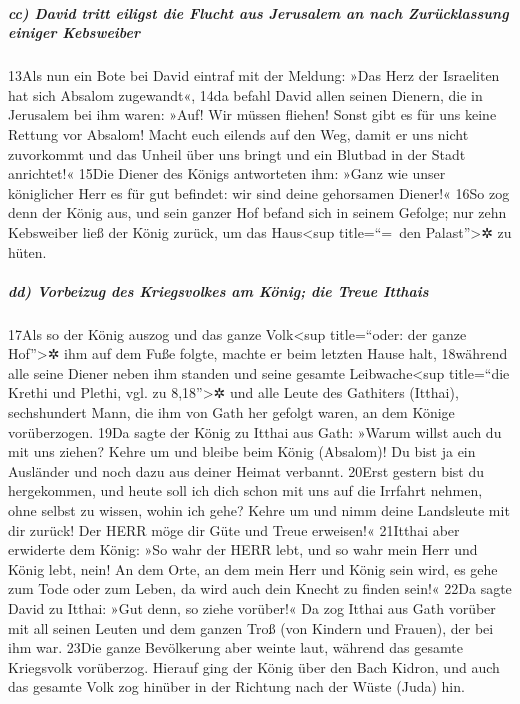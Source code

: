 \hypertarget{cc-david-tritt-eiligst-die-flucht-aus-jerusalem-an-nach-zuruxfccklassung-einiger-kebsweiber}{%
\subparagraph{cc) David tritt eiligst die Flucht aus Jerusalem an nach
Zurücklassung einiger
Kebsweiber}\label{cc-david-tritt-eiligst-die-flucht-aus-jerusalem-an-nach-zuruxfccklassung-einiger-kebsweiber}}

13Als nun ein Bote bei David eintraf mit der Meldung: »Das Herz der
Israeliten hat sich Absalom zugewandt«, 14da befahl David allen seinen
Dienern, die in Jerusalem bei ihm waren: »Auf! Wir müssen fliehen! Sonst
gibt es für uns keine Rettung vor Absalom! Macht euch eilends auf den
Weg, damit er uns nicht zuvorkommt und das Unheil über uns bringt und
ein Blutbad in der Stadt anrichtet!« 15Die Diener des Königs antworteten
ihm: »Ganz wie unser königlicher Herr es für gut befindet: wir sind
deine gehorsamen Diener!« 16So zog denn der König aus, und sein ganzer
Hof befand sich in seinem Gefolge; nur zehn Kebsweiber ließ der König
zurück, um das Haus\textless sup title=``=~den Palast''\textgreater✲ zu
hüten.

\hypertarget{dd-vorbeizug-des-kriegsvolkes-am-kuxf6nig-die-treue-itthais}{%
\subparagraph{dd) Vorbeizug des Kriegsvolkes am König; die Treue
Itthais}\label{dd-vorbeizug-des-kriegsvolkes-am-kuxf6nig-die-treue-itthais}}

17Als so der König auszog und das ganze Volk\textless sup title=``oder:
der ganze Hof''\textgreater✲ ihm auf dem Fuße folgte, machte er beim
letzten Hause halt, 18während alle seine Diener neben ihm standen und
seine gesamte Leibwache\textless sup title=``die Krethi und Plethi, vgl.
zu 8,18''\textgreater✲ und alle Leute des Gathiters (Itthai),
sechshundert Mann, die ihm von Gath her gefolgt waren, an dem Könige
vorüberzogen. 19Da sagte der König zu Itthai aus Gath: »Warum willst
auch du mit uns ziehen? Kehre um und bleibe beim König (Absalom)! Du
bist ja ein Ausländer und noch dazu aus deiner Heimat verbannt. 20Erst
gestern bist du hergekommen, und heute soll ich dich schon mit uns auf
die Irrfahrt nehmen, ohne selbst zu wissen, wohin ich gehe? Kehre um und
nimm deine Landsleute mit dir zurück! Der HERR möge dir Güte und Treue
erweisen!« 21Itthai aber erwiderte dem König: »So wahr der HERR lebt,
und so wahr mein Herr und König lebt, nein! An dem Orte, an dem mein
Herr und König sein wird, es gehe zum Tode oder zum Leben, da wird auch
dein Knecht zu finden sein!« 22Da sagte David zu Itthai: »Gut denn, so
ziehe vorüber!« Da zog Itthai aus Gath vorüber mit all seinen Leuten und
dem ganzen Troß (von Kindern und Frauen), der bei ihm war. 23Die ganze
Bevölkerung aber weinte laut, während das gesamte Kriegsvolk vorüberzog.
Hierauf ging der König über den Bach Kidron, und auch das gesamte Volk
zog hinüber in der Richtung nach der Wüste (Juda) hin.

